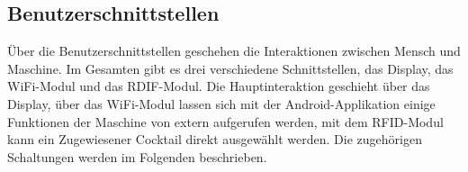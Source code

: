 \subsection{Benutzerschnittstellen}
\label{subsec:Benutzerschnittstellen}

Über die Benutzerschnittstellen geschehen die Interaktionen zwischen Mensch und Maschine. Im Gesamten gibt es drei verschiedene Schnittstellen, das Display, das WiFi-Modul und das RDIF-Modul. Die Hauptinteraktion geschieht über das Display, über das WiFi-Modul lassen sich mit der Android-Applikation einige Funktionen der Maschine von extern aufgerufen werden, mit dem RFID-Modul kann ein Zugewiesener Cocktail direkt ausgewählt werden. Die zugehörigen Schaltungen werden im Folgenden beschrieben.

%
%
% 